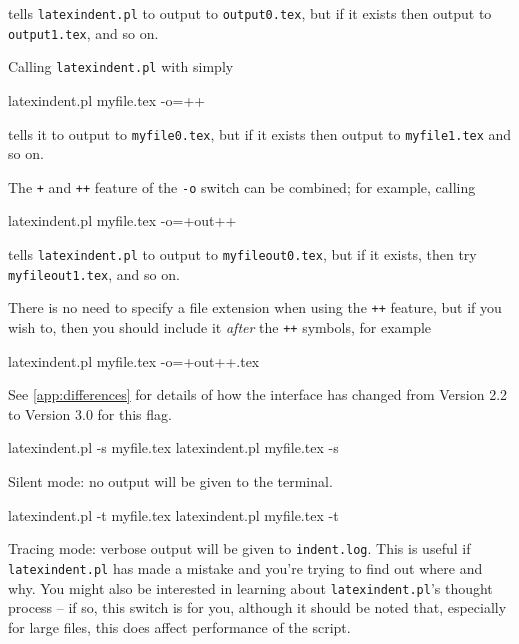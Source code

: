  tells \texttt{latexindent.pl} to output to \texttt{output0.tex}, but if it exists then
 output to \texttt{output1.tex}, and so on.

 Calling \texttt{latexindent.pl} with simply

 \begin{commandshell}
latexindent.pl myfile.tex -o=++
\end{commandshell}

 tells it to output to \texttt{myfile0.tex}, but if it exists then output to
 \texttt{myfile1.tex} and so on.

 The \texttt{+} and \texttt{++} feature of the \texttt{-o} switch can be combined; for
 example, calling

 \begin{commandshell}
latexindent.pl myfile.tex -o=+out++
\end{commandshell}

 tells \texttt{latexindent.pl} to output to \texttt{myfileout0.tex}, but if it exists,
 then try \texttt{myfileout1.tex}, and so on.

 There is no need to specify a file extension when using the \texttt{++} feature, but if
 you wish to, then you should include it \emph{after} the \texttt{++} symbols, for
 example

 \begin{commandshell}
latexindent.pl myfile.tex -o=+out++.tex
\end{commandshell}

 See \vref{app:differences} for details of how the interface has changed from Version 2.2
 to Version 3.0 for this flag.  

 \begin{commandshell}
latexindent.pl -s myfile.tex
latexindent.pl myfile.tex -s
\end{commandshell}

 Silent mode: no output will be given to the terminal.


 \begin{commandshell}
latexindent.pl -t myfile.tex
latexindent.pl myfile.tex -t
\end{commandshell}

 \label{page:traceswitch}
 Tracing mode: verbose output will be given to \texttt{indent.log}. This is useful if
 \texttt{latexindent.pl} has made a mistake and you're trying to find out where and why.
 You might also be interested in learning about \texttt{latexindent.pl}'s thought process
 -- if so, this switch is for you, although it should be noted that, especially for large
 files, this does affect performance of the script.

